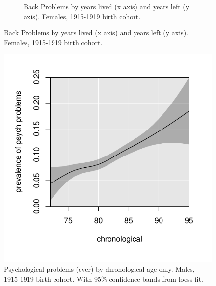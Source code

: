 \documentclass[11pt,oneside]{article} %
\begin{document}
\begin{figure}[!h]
	\begin{subfigure}{\linewidth}
    \caption{Back Problems by
    years lived (x axis) and years left (y axis). Females, 1915-1919 birth
    cohort.}
    \label{fig:back}
	\vspace{-2em}
	\end{subfigure}
\end{figure}

\begin{figure}[!h]
 \centering
   \caption{Psychological problems (ever) by chronological age only. Males, 1915-1919 birth
    cohort. With 95{\%} confidence bands from loess fit.}
    \label{fig:chronofalse}
   \includegraphics[scale=.7]{Figures/MalePsychChrono.pdf}
\end{figure}
\end{document}

